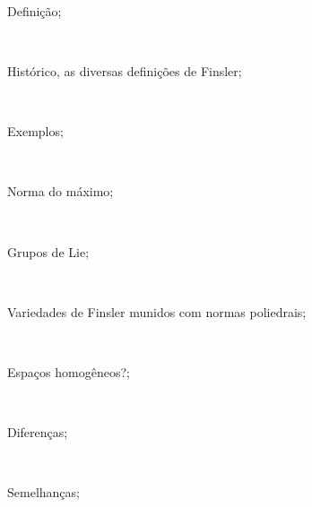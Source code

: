 \documentclass[10pt,reqno]{amsart}
\begin{document}
\

\

\

Definição;

\

Histórico, as diversas definições de Finsler;

\

Exemplos;

\

Norma do máximo;

\

Grupos de Lie;

\

Variedades de Finsler munidos com normas poliedrais;

\

Espaços homogêneos?;

\

Diferenças;

\

Semelhanças;



{}
\end{document}
